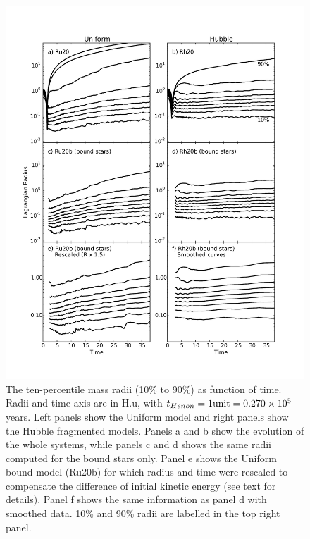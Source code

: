 

\begin{figure}
\begin{center}
\includegraphics[width=\textwidth,clip=true]{Figures/3_Lagr_radius}
\caption{The ten-percentile mass radii (10\% to 90\%) as function of time. Radii and time axis are in H.u, with $t_{Henon} = 1 {\rm unit} =  0.270 \times 10^5 $ years. Left panels show the Uniform model and right panels show the Hubble fragmented models. Panels a and b show the evolution of the whole systems, while panels c and d shows the same radii computed for the bound stars only. Panel e shows the Uniform bound model (Ru20b) for which radius and time were rescaled to compensate the difference of initial kinetic energy (see text for details). Panel f shows the same information as panel d with smoothed data. 10\% and 90\% radii are labelled in the top right panel.
}
\label{Fig:3_Lagr_radius}
\end{center}
\end{figure}


